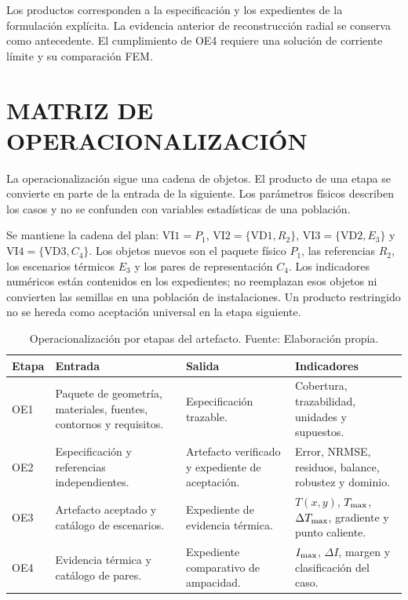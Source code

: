 Los productos corresponden a la especificación y los expedientes de la formulación explícita. La evidencia anterior de reconstrucción radial se conserva como antecedente. El cumplimiento de OE4 requiere una solución de corriente límite y su comparación FEM.

\section{MATRIZ DE OPERACIONALIZACIÓN}
\label{anx:operacionalizacion}

La operacionalización sigue una cadena de objetos. El producto de una etapa se convierte en parte de la entrada de la siguiente. Los parámetros físicos describen los casos y no se confunden con variables estadísticas de una población.

Se mantiene la cadena del plan: $\mathrm{VI1}=P_1$, $\mathrm{VI2}=\{\mathrm{VD1},R_2\}$, $\mathrm{VI3}=\{\mathrm{VD2},E_3\}$ y $\mathrm{VI4}=\{\mathrm{VD3},C_4\}$. Los objetos nuevos son el paquete físico $P_1$, las referencias $R_2$, los escenarios térmicos $E_3$ y los pares de representación $C_4$. Los indicadores numéricos están contenidos en los expedientes; no reemplazan esos objetos ni convierten las semillas en una población de instalaciones. Un producto restringido no se hereda como aceptación universal en la etapa siguiente.

\begin{table}[H]
\centering
\caption{Operacionalización por etapas del artefacto. Fuente: Elaboración propia.}
\label{tab:operacionalizacion}
\scriptsize
\setlength{\tabcolsep}{3pt}
\begin{tabularx}{\textwidth}{L{1.0cm}Y Y Y}
\toprule
\textbf{Etapa} & \textbf{Entrada} & \textbf{Salida} & \textbf{Indicadores} \\
\midrule
OE1 & Paquete de geometría, materiales, fuentes, contornos y requisitos. & Especificación trazable. & Cobertura, trazabilidad, unidades y supuestos. \\
OE2 & Especificación y referencias independientes. & Artefacto verificado y expediente de aceptación. & Error, NRMSE, residuos, balance, robustez y dominio. \\
OE3 & Artefacto aceptado y catálogo de escenarios. & Expediente de evidencia térmica. & $T(x,y)$, $T_{\max}$, $\Delta T_{\max}$, gradiente y punto caliente. \\
OE4 & Evidencia térmica y catálogo de pares. & Expediente comparativo de ampacidad. & $I_{\max}$, $\Delta I$, margen y clasificación del caso. \\
\bottomrule
\end{tabularx}
\end{table}

